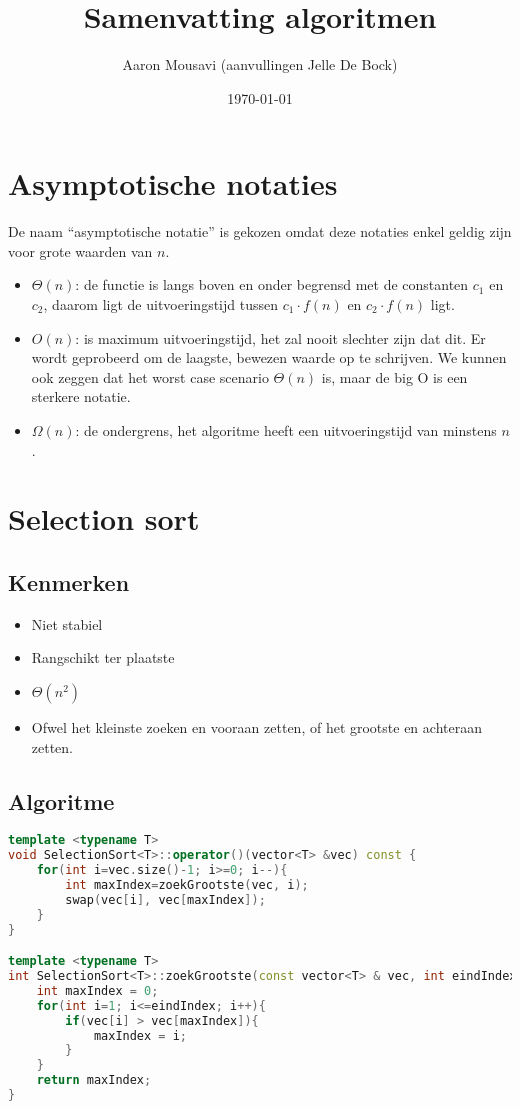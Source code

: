 \documentclass[a4paper]{article}
\title{Samenvatting algoritmen}
\author{Aaron Mousavi (aanvullingen Jelle De Bock)}
\date{\today}
\begin{document}
\maketitle
\newpage
\section{Asymptotische notaties}
De naam ``asymptotische notatie'' is gekozen omdat deze notaties enkel geldig zijn voor grote waarden van $n$.

\begin{itemize}
	\item $\Theta(n)$: de functie is langs boven en onder begrensd met de constanten $c_1$ en $c_2$, daarom ligt de uitvoeringstijd tussen $c_1 \cdot f(n)$ en $c_2 \cdot f(n)$ ligt.
	\item $O(n)$: is maximum uitvoeringstijd, het zal nooit slechter zijn dat dit. Er wordt geprobeerd om de laagste, bewezen waarde op te schrijven. We kunnen ook zeggen dat het worst case scenario $\Theta(n)$ is, maar de big O is een sterkere notatie.
	\item $\Omega(n)$: de ondergrens, het algoritme heeft een uitvoeringstijd van minstens $n$. 
\end{itemize}
\newpage

\section{Selection sort}
\subsection*{Kenmerken}
\begin{itemize}
	\item Niet stabiel
	\item Rangschikt ter plaatste
	\item $\Theta(n^2)$
	\item Ofwel het kleinste zoeken en vooraan zetten, of het grootste en achteraan zetten.
\end{itemize}

\subsection*{Algoritme}
\begin{lstlisting}[language=C++]
template <typename T>
void SelectionSort<T>::operator()(vector<T> &vec) const {
	for(int i=vec.size()-1; i>=0; i--){
		int maxIndex=zoekGrootste(vec, i);
		swap(vec[i], vec[maxIndex]);
    }
}

template <typename T>
int SelectionSort<T>::zoekGrootste(const vector<T> & vec, int eindIndex) const {
	int maxIndex = 0;
	for(int i=1; i<=eindIndex; i++){
		if(vec[i] > vec[maxIndex]){
			maxIndex = i;
		}
	}
	return maxIndex;
}
\end{lstlisting}
\end{document}
